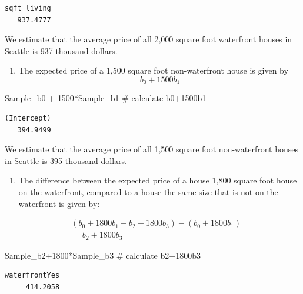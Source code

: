 \documentclass[
  letterpaper,
  DIV=11,
  numbers=noendperiod]{scrreprt}
\newenvironment{Shaded}{\begin{snugshade}}{\end{snugshade}}
\newcommand{\CommentTok}[1]{\textcolor[rgb]{0.37,0.37,0.37}{#1}}
\newcommand{\DecValTok}[1]{\textcolor[rgb]{0.68,0.00,0.00}{#1}}
\newcommand{\NormalTok}[1]{\textcolor[rgb]{0.00,0.23,0.31}{#1}}
\newcommand{\SpecialCharTok}[1]{\textcolor[rgb]{0.37,0.37,0.37}{#1}}
\providecommand{\tightlist}{%
  \setlength{\itemsep}{0pt}\setlength{\parskip}{0pt}}\usepackage{longtable,booktabs,array}
\begin{document}
\begin{verbatim}
sqft_living 
   937.4777 
\end{verbatim}

We estimate that the average price of all 2,000 square foot waterfront
houses in Seattle is 937 thousand dollars.

\begin{enumerate}
\def\labelenumi{\arabic{enumi}.}
\setcounter{enumi}{1}
\tightlist
\item
  The expected price of a 1,500 square foot non-waterfront house is
  given by \[b_0 + 1500b_1\]
\end{enumerate}

\begin{Shaded}
\begin{Highlighting}[]
\NormalTok{Sample\_b0 }\SpecialCharTok{+} \DecValTok{1500}\SpecialCharTok{*}\NormalTok{Sample\_b1 }\CommentTok{\# calculate b0+1500b1+}
\end{Highlighting}
\end{Shaded}

\begin{verbatim}
(Intercept) 
   394.9499 
\end{verbatim}

We estimate that the average price of all 1,500 square foot
non-waterfront houses in Seattle is 395 thousand dollars.

\begin{enumerate}
\def\labelenumi{\arabic{enumi}.}
\setcounter{enumi}{2}
\tightlist
\item
  The difference between the expected price of a house 1,800 square foot
  house on the waterfront, compared to a house the same size that is not
  on the waterfront is given by:
\end{enumerate}

\[
\begin{aligned}
& (b_0 + 1800b_1 + b_2 + 1800b_3) - (b_0 + 1800b_1) \\
& = b_2 +1800b_3
\end{aligned}
\]

\begin{Shaded}
\begin{Highlighting}[]
\NormalTok{Sample\_b2}\SpecialCharTok{+}\DecValTok{1800}\SpecialCharTok{*}\NormalTok{Sample\_b3 }\CommentTok{\# calculate b2+1800b3}
\end{Highlighting}
\end{Shaded}

\begin{verbatim}
waterfrontYes 
     414.2058 
\end{verbatim}
\end{document}
